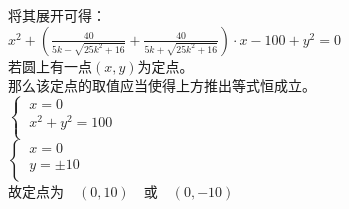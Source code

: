 \documentclass[UTF8]{ctexart}
\begin{document}
\begin{multicols}{2}
        将其展开可得：\\[3mm]
        $x^2+\left(\frac{40}{5k-\sqrt{25k^2+16}}+\frac{40}{5k+\sqrt{25k^2+16}}\right)\cdot x-100+y^2=0$\\[8mm]
        若圆上有一点$(x,y)$为定点。\\[3mm]
        那么该定点的取值应当使得上方推出等式恒成立。\\[5mm]
        \begin{math}
            \begin{cases}
                ~x=0\\[1mm]
                ~x^2+y^2=100\\[1mm]
            \end{cases}
        \end{math}\\[5mm]
        \begin{math}
            \begin{cases}
                ~x=0\\[1mm]
                ~y=\pm 10\\[1mm]
            \end{cases}
        \end{math}\\[5mm]
        故定点为~~$(0,10)$~~或~~$(0,-10)$
        \newpage
    \end{multicols}


\newpage
\end{document}
